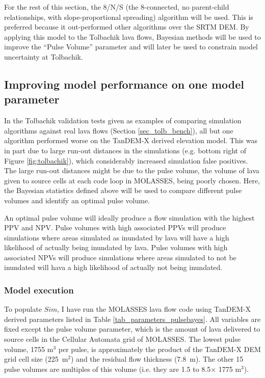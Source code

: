 	For the rest of this section, the 8/N/S (the 8-connected, no parent-child relationships, with slope-proportional spreading) algorithm will be used. This is preferred because it out-performed other algorithms over the SRTM DEM. By applying this model to the Tolbachik lava flows, Bayesian methods will be used to improve the ``Pulse Volume'' parameter and will later be used to constrain model uncertainty at Tolbachik.
	
	\subsection{Improving model performance on one model parameter}\label{sec_bayespulse}
	In the Tolbachik validation tests given as examples of comparing simulation algorithms against real lava flows (Section \ref {sec_tolb_bench}), all but one algorithm performed worse on the TanDEM-X derived elevation model. This was in part due to large run-out distances in the simulations (e.g. bottom right of Figure \ref{fig:tolbachik}), which considerably increased simulation false positives. The large run-out distances might be due to the pulse volume, the volume of lava given to source cells at each code loop in MOLASSES, being poorly chosen. Here, the Bayesian statistics defined above will be used to compare different pulse volumes and identify an optimal pulse volume. 
		
		An optimal pulse volume will ideally produce a flow simulation with the highest PPV and NPV. Pulse volumes with high associated PPVs will produce simulations where areas simulated as inundated by lava will have a high likelihood of actually being inundated by lava. Pulse volumes with high associated NPVs will produce simulations where areas simulated to not be inundated will hava a high likelihood of actually not being inundated.
		
		\subsubsection{Model execution} 
		To populate $Sim$, I have run the MOLASSES lava flow code using TanDEM-X derived parameters listed in Table \ref{tab_parameters_pulsebayes}. All variables are fixed except the pulse volume parameter, which is the amount of lava delivered to source cells in the Cellular Automata grid of MOLASSES. The lowest pulse volume, 1755 m$^3$ per pulse, is approximately the product of the TanDEM-X DEM grid cell size (225~m$^2$) and the residual flow thickness (7.8~m). The other 15 pulse volumes are multiples of this volume (i.e. they are 1.5 to 8.5$\times$ 1775 m$^3$).
		
